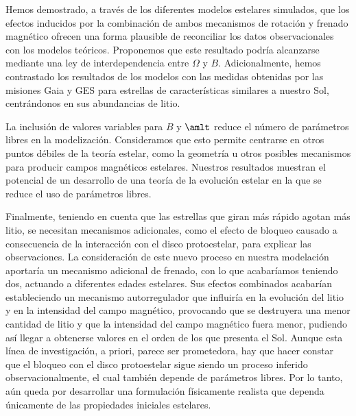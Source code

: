 Hemos demostrado, a través de los diferentes modelos estelares simulados, que los efectos inducidos por la combinación de ambos mecanismos de rotación y frenado magnético ofrecen una forma plausible de reconciliar los datos observacionales con los modelos teóricos. Proponemos que este resultado podría alcanzarse mediante una ley de interdependencia entre $\Omega$ y $B$. Adicionalmente, hemos contrastado los resultados de los modelos con las medidas obtenidas por las misiones Gaia y GES para estrellas de características similares a nuestro Sol, centrándonos en sus abundancias de litio.\par

La inclusión de valores variables para $B$ y $\amlt$ reduce el número de parámetros libres en la modelización. Consideramos que esto permite centrarse en otros puntos débiles de la teoría estelar, como la geometría u otros posibles mecanismos para producir campos magnéticos estelares. Nuestros resultados muestran el potencial de un desarrollo de una teoría de la evolución estelar en la que se reduce el uso de parámetros libres.\par

Finalmente, teniendo en cuenta que las estrellas que giran más rápido agotan más litio, se necesitan mecanismos adicionales, como el efecto de bloqueo causado a consecuencia de la interacción con el disco protoestelar, para explicar las observaciones. La consideración de este nuevo proceso en nuestra modelación aportaría un mecanismo adicional de frenado, con lo que acabaríamos teniendo dos, actuando a diferentes edades estelares. Sus efectos combinados acabarían estableciendo un mecanismo autorregulador que influiría en la evolución del litio y en la intensidad del campo magnético, provocando que se destruyera una menor cantidad de litio y que la intensidad del campo magnético fuera menor, pudiendo así llegar a obtenerse valores en el orden de los que presenta el Sol. Aunque esta línea de investigación, a priori, parece ser prometedora, hay que hacer constar que el bloqueo con el disco protoestelar sigue siendo un proceso inferido observacionalmente, el cual también depende de parámetros libres. Por lo tanto, aún queda por desarrollar una formulación físicamente realista que dependa únicamente de las propiedades iniciales estelares.\par

\endinput
